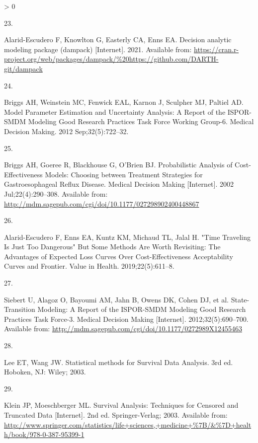 \documentclass[
]{article}
\newlength{\cslhangindent}
\newlength{\csllabelwidth}
\newenvironment{CSLReferences}[2] %
 {%
  \setlength{\parindent}{0pt}
  \ifodd #1 \everypar{\setlength{\hangindent}{\cslhangindent}}\ignorespaces\fi
  \ifnum #2 > 0
  \setlength{\parskip}{#2\baselineskip}
  \fi
 }%
 {}
\newcommand{\CSLLeftMargin}[1]{\parbox[t]{\csllabelwidth}{#1}}
\newcommand{\CSLRightInline}[1]{\parbox[t]{\linewidth - \csllabelwidth}{#1}\break}
\begin{document}
\begin{CSLReferences}{0}{0}
\leavevmode\hypertarget{ref-Alarid-Escudero2021}{}%
\CSLLeftMargin{23. }
\CSLRightInline{Alarid-Escudero F, Knowlton G, Easterly CA, Enns EA. Decision analytic modeling package (dampack) {[}Internet{]}. 2021. Available from: \url{https://cran.r-project.org/web/packages/dampack/\%20https://github.com/DARTH-git/dampack}}

\leavevmode\hypertarget{ref-Briggs2012}{}%
\CSLLeftMargin{24. }
\CSLRightInline{Briggs AH, Weinstein MC, Fenwick EAL, Karnon J, Sculpher MJ, Paltiel AD. {Model Parameter Estimation and Uncertainty Analysis: A Report of the ISPOR-SMDM Modeling Good Research Practices Task Force Working Group-6.} Medical Decision Making. 2012 Sep;32(5):722--32. }

\leavevmode\hypertarget{ref-Briggs2002}{}%
\CSLLeftMargin{25. }
\CSLRightInline{Briggs AH, Goeree R, Blackhouse G, O'Brien BJ. {Probabilistic Analysis of Cost-Effectiveness Models: Choosing between Treatment Strategies for Gastroesophageal Reflux Disease}. Medical Decision Making {[}Internet{]}. 2002 Jul;22(4):290--308. Available from: \url{http://mdm.sagepub.com/cgi/doi/10.1177/027298902400448867}}

\leavevmode\hypertarget{ref-Alarid-Escudero2019}{}%
\CSLLeftMargin{26. }
\CSLRightInline{Alarid-Escudero F, Enns EA, Kuntz KM, Michaud TL, Jalal H. {"Time Traveling Is Just Too Dangerous" But Some Methods Are Worth Revisiting: The Advantages of Expected Loss Curves Over Cost-Effectiveness Acceptability Curves and Frontier}. Value in Health. 2019;22(5):611--8. }

\leavevmode\hypertarget{ref-Siebert2012c}{}%
\CSLLeftMargin{27. }
\CSLRightInline{Siebert U, Alagoz O, Bayoumi AM, Jahn B, Owens DK, Cohen DJ, et al. {State-Transition Modeling: A Report of the ISPOR-SMDM Modeling Good Research Practices Task Force-3}. Medical Decision Making {[}Internet{]}. 2012;32(5):690--700. Available from: \url{http://mdm.sagepub.com/cgi/doi/10.1177/0272989X12455463}}

\leavevmode\hypertarget{ref-Lee2003a}{}%
\CSLLeftMargin{28. }
\CSLRightInline{Lee ET, Wang JW. {Statistical methods for Survival Data Analysis}. 3rd ed. Hoboken, NJ: Wiley; 2003. }

\leavevmode\hypertarget{ref-Klein2003}{}%
\CSLLeftMargin{29. }
\CSLRightInline{Klein JP, Moeschberger ML. {Survival Analysis: Techniques for Censored and Truncated Data} {[}Internet{]}. 2nd ed. Springer-Verlag; 2003. Available from: \url{http://www.springer.com/statistics/life+sciences,+medicine+\%7B/\&\%7D+health/book/978-0-387-95399-1}}


\end{CSLReferences}
\end{document}
